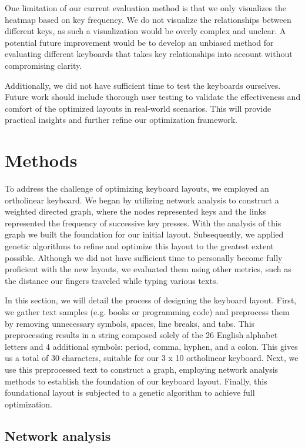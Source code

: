 \documentclass[9pt,twocolumn,twoside]{pnas-report}
\begin{document}
One limitation of our current evaluation method is that we only visualizes the heatmap based on key frequency.
We do not visualize the relationships between different keys, as such a visualization would be overly complex and unclear.
A potential future improvement would be to develop an unbiased method for evaluating different keyboards that takes key relationships into account without compromising clarity.

Additionally, we did not have sufficient time to test the keyboards ourselves.
Future work should include thorough user testing to validate the effectiveness and comfort of the optimized layouts in real-world scenarios.
This will provide practical insights and further refine our optimization framework.

{\small

\section*{Methods}

To address the challenge of optimizing keyboard layouts, we employed an ortholinear keyboard.
We began by utilizing network analysis to construct a weighted directed graph, where the nodes represented keys and the links represented the frequency of successive key presses.
With the analysis of this graph we built the foundation for our initial layout.
Subsequently, we applied genetic algorithms to refine and optimize this layout to the greatest extent possible.
Although we did not have sufficient time to personally become fully proficient with the new layouts, we evaluated them using other metrics, such as the distance our fingers traveled while typing various texts.

In this section, we will detail the process of designing the keyboard layout.
First, we gather text samples (e.g. books or programming code) and preprocess them by removing unnecessary symbols, spaces, line breaks, and tabs.
This preprocessing results in a string composed solely of the 26 English alphabet letters and 4 additional symbols: period, comma, hyphen, and a colon.
This gives us a total of 30 characters, suitable for our 3 x 10 ortholinear keyboard.
Next, we use this preprocessed text to construct a graph, employing network analysis methods to establish the foundation of our keyboard layout.
Finally, this foundational layout is subjected to a genetic algorithm to achieve full optimization.

\subsection*{Network analysis}

}
\end{document}
